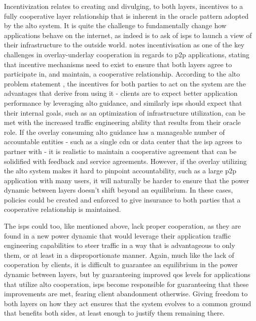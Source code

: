     Incentivization relates to creating and divulging, to both layers, incentives to a fully cooperative layer relationship that is inherent in the oracle pattern adopted by the \gls{alto} system.
    It is quite the challenge to fundamentally change how applications behave on the internet, as indeed is to ask of \glspl{isp} to launch a view of their infrastructure to the outside world.
    \cite{dan-Commag10} notes incentivisation as one of the key challenges in overlay-underlay cooperation in regards to \gls{p2p} applications, stating that incentive mechanisms need to exist to ensure that both layers agree to participate in, and maintain, a cooperative relationship.
    According to the \gls{alto} problem statement \cite{alto-problem-statement}, the incentives for both parties to act on the system are the advantages that derive from using it - clients are to expect better application performance by leveraging \gls{alto} guidance, and similarly \glspl{isp} should expect that their internal goals, such as an optimization of infrastructure utilization, can be met with the increased traffic engineering ability that results from their oracle role.
    If the overlay consuming \gls{alto} guidance has a manageable number of accountable entities - such as a single \gls{cdn} or data center that the \gls{isp} agrees to partner with - it is realistic to maintain a cooperative agreement that can be solidified with feedback and service agreements.
    However, if the overlay utilizing the \gls{alto} system makes it hard to pinpoint accountability, such as a large \gls{p2p} application with many users, it will naturally be harder to ensure that the power dynamic between layers doesn't shift beyond an equilibrium.
    In these cases, policies could be created and enforced to give insurance to both parties that a cooperative relationship is maintained.

    The \glspl{isp} could too, like mentioned above, lack proper cooperation, as they are found in a new power dynamic that would leverage their application traffic engineering capabilities to steer traffic in a way that is advantageous to only them, or at least in a disproportionate manner.
    Again, much like the lack of cooperation by clients, it is difficult to guarantee an equilibrium in the power dynamic between layers, but by guaranteeing improved \gls{qos} levels for applications that utilize \gls{alto} cooperation, \glspl{isp} become responsible for guaranteeing that these improvements are met, fearing client abandonment otherwise.
    Giving freedom to both layers on how they act ensures that the system evolves to a common ground that benefits both sides, at least enough to justify them remaining there.

